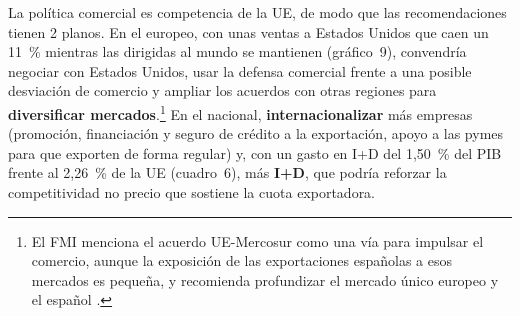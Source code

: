 \begin{examen}
La política comercial es competencia de la UE, de modo que las recomendaciones tienen 2 planos. En el europeo, con unas ventas a Estados Unidos que caen un 11~\% mientras las dirigidas al mundo se mantienen (gráfico~9), convendría negociar con Estados Unidos, usar la defensa comercial frente a una posible desviación de comercio y ampliar los acuerdos con otras regiones para \textbf{diversificar mercados}.\footnote{El FMI menciona el acuerdo UE-Mercosur como una vía para impulsar el comercio, aunque la exposición de las exportaciones españolas a esos mercados es pequeña, y recomienda profundizar el mercado único europeo y el español .} En el nacional, \textbf{internacionalizar} más empresas (promoción, financiación y seguro de crédito a la exportación, apoyo a las pymes para que exporten de forma regular) y, con un gasto en I+D del 1,50~\% del PIB frente al 2,26~\% de la UE (cuadro~6), más \textbf{I+D}, que podría reforzar la competitividad no precio que sostiene la cuota exportadora.

\end{examen}


